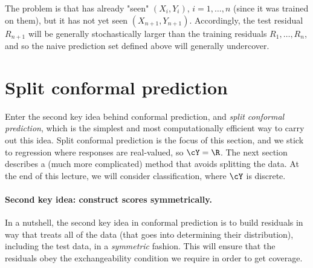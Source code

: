 \documentclass{article}
\begin{document}
The problem is that  has already "seen" $(X_i,Y_i)$,
$i=1,\dots,n$ (since it was trained on them), but it has not yet seen
$(X_{n+1},Y_{n+1})$. Accordingly, the test residual $R_{n+1}$ will be generally
stochastically larger than the training residuals $R_1,\dots,R_n$, and so the
naive prediction set defined above will generally undercover. 

\section{Split conformal prediction}

Enter the second key idea behind conformal prediction, and \emph{split conformal
  prediction}, which is the simplest and most computationally efficient way to
carry out this idea. Split conformal prediction is the focus of this section,
and we stick to regression where responses are real-valued, so $\cY = \R$.  
The next section describes a (much more complicated) method that avoids
splitting the data. At the end of this lecture, we will consider classification,
where $\cY$ is discrete.     

\paragraph{Second key idea: construct scores symmetrically.}

In a nutshell, the second key idea in conformal prediction is to build residuals
in way that treats all of the data (that goes into determining their
distribution), including the test data, in a \emph{symmetric} fashion. This will
ensure that the residuals obey the exchangeability condition we require in order
to get coverage. 
\end{document}
